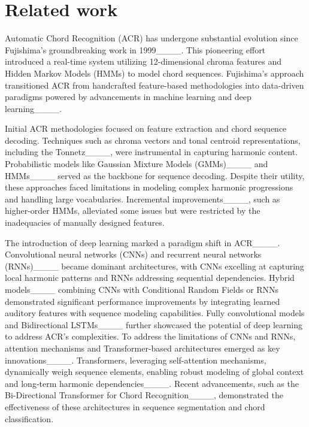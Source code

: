 \section{Related work}
\label{rw}

Automatic Chord Recognition (ACR) has undergone substantial evolution since Fujishima's groundbreaking work in 1999____. This pioneering effort introduced a real-time system utilizing 12-dimensional chroma features and Hidden Markov Models (HMMs) to model chord sequences. Fujishima’s approach transitioned ACR from handcrafted feature-based methodologies into data-driven paradigms powered by advancements in machine learning and deep learning____.

Initial ACR methodologies focused on feature extraction and chord sequence decoding. Techniques such as chroma vectors and tonal centroid representations, including the Tonnetz____, were instrumental in capturing harmonic content. Probabilistic models like Gaussian Mixture Models (GMMs)____ and HMMs____ served as the backbone for sequence decoding. Despite their utility, these approaches faced limitations in modeling complex harmonic progressions and handling large vocabularies. Incremental improvements____, such as higher-order HMMs, alleviated some issues but were restricted by the inadequacies of manually designed features.

The introduction of deep learning marked a paradigm shift in ACR____. Convolutional neural networks (CNNs) and recurrent neural networks (RNNs)____ became dominant architectures, with CNNs excelling at capturing local harmonic patterns and RNNs addressing sequential dependencies. Hybrid models____ combining CNNs with Conditional Random Fields or RNNs demonstrated significant performance improvements by integrating learned auditory features with sequence modeling capabilities. Fully convolutional models and Bidirectional LSTMs____ further showcased the potential of deep learning to address ACR's complexities. To address the limitations of CNNs and RNNs, attention mechanisms and Transformer-based architectures emerged as key innovations____. Transformers, leveraging self-attention mechanisms, dynamically weigh sequence elements, enabling robust modeling of global context and long-term harmonic dependencies____. Recent advancements, such as the Bi-Directional Transformer for Chord Recognition____, demonstrated the effectiveness of these architectures in sequence segmentation and chord classification.

